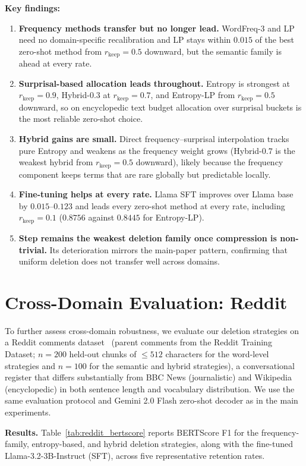 \documentclass[11pt]{article}
\newcommand{\rkeep}{r_{\mathrm{keep}}}
\begin{document}
\textbf{Key findings:}
\begin{enumerate}
    \item \textbf{Frequency methods transfer but no longer lead.} WordFreq-3 and LP need no domain-specific recalibration and LP stays within $0.015$ of the best zero-shot method from $\rkeep = 0.5$ downward, but the semantic family is ahead at every rate.
    \item \textbf{Surprisal-based allocation leads throughout.} Entropy is strongest at $\rkeep=0.9$, Hybrid-$0.3$ at $\rkeep=0.7$, and Entropy-LP from $\rkeep=0.5$ downward, so on encyclopedic text budget allocation over surprisal buckets is the most reliable zero-shot choice.
    \item \textbf{Hybrid gains are small.} Direct frequency--surprisal interpolation tracks pure Entropy and weakens as the frequency weight grows (Hybrid-$0.7$ is the weakest hybrid from $\rkeep = 0.5$ downward), likely because the frequency component keeps terms that are rare globally but predictable locally.
    \item \textbf{Fine-tuning helps at every rate.} Llama SFT improves over Llama base by $0.015$--$0.123$ and leads every zero-shot method at every rate, including $\rkeep = 0.1$ ($0.8756$ against $0.8445$ for Entropy-LP).
    \item \textbf{Step remains the weakest deletion family once compression is non-trivial.} Its deterioration mirrors the main-paper pattern, confirming that uniform deletion does not transfer well across domains.
\end{enumerate}

\section{Cross-Domain Evaluation: Reddit}
\label{app:reddit_eval}

To further assess cross-domain robustness, we evaluate our deletion strategies on a
Reddit comments dataset~\citep{mentionbroker2023reddit} (parent comments from the Reddit Training Dataset; $n{=}200$ held-out chunks
of $\le 512$ characters for the word-level strategies and $n{=}100$ for the semantic and hybrid strategies), a conversational register that differs substantially from BBC News
(journalistic) and Wikipedia (encyclopedic) in both sentence length and vocabulary distribution.
We use the same evaluation protocol and Gemini 2.0 Flash zero-shot decoder as in the main experiments.

\textbf{Results.}
Table~\ref{tab:reddit_bertscore} reports BERTScore F1 for the frequency-family,
entropy-based, and hybrid deletion strategies, along with the fine-tuned Llama-3.2-3B-Instruct (SFT),
across five representative retention rates.
\end{document}
